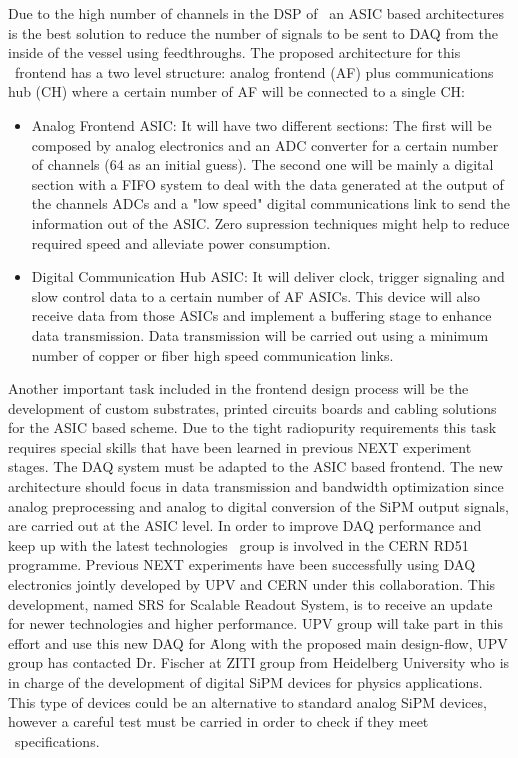 \indent
Due to the high number of channels in the DSP of \NHD\ an ASIC based architectures is the best solution to reduce the number of signals to be sent to DAQ from the inside of the vessel using feedthroughs. The proposed architecture for this \NHD\ frontend has a two level structure: analog frontend (AF) plus communications hub (CH) where a certain number of AF will be connected to a single CH:
\begin{itemize}
    \item Analog Frontend ASIC: It will have two different sections: The first will be composed by analog electronics and an ADC converter for a certain number of channels (64 as an initial guess). The second one will be mainly a digital section with a FIFO system to deal with the data generated at the output of the channels ADCs and a "low speed" digital communications link to send the information out of the ASIC. Zero supression techniques might help to reduce required speed and alleviate power consumption.
    \item Digital Communication Hub ASIC: It will deliver clock, trigger signaling and slow control data to a certain number of AF ASICs. This device will also receive data from those ASICs and implement a buffering stage to enhance data transmission. Data transmission will be carried out using a minimum number of copper or fiber high speed communication links.
\end{itemize}
Another important task included in the frontend design process will be the development of custom substrates, printed circuits boards and cabling solutions for the ASIC based scheme. Due to the tight radiopurity requirements this task requires special skills that have been learned in previous NEXT experiment stages.
The DAQ system must be adapted to the ASIC based frontend. The new architecture should focus in data transmission and bandwidth optimization since analog preprocessing and analog to digital conversion of the SiPM output signals, are carried out at the ASIC level. In order to improve DAQ performance and keep up with the latest technologies \sUPV\ group is involved in the CERN RD51 programme. Previous NEXT experiments have been successfully using DAQ electronics jointly developed by UPV and CERN under this collaboration. This development, named SRS for Scalable Readout System, is to receive an update for newer technologies and higher performance. UPV group will take part in this effort and use this new DAQ for \NHD\.

Along with the proposed main design-flow, UPV group has contacted Dr. Fischer at ZITI group from Heidelberg University who is in charge of the development of digital SiPM devices for physics applications. This type of devices could be an alternative to standard analog SiPM devices, however a careful test must be carried in order to check if they meet \NHD\ specifications.



